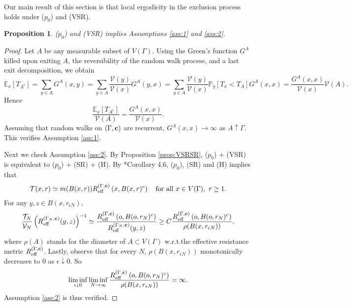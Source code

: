 \documentclass[11pt]{amsart}
\theoremstyle{plain}
\newtheorem{proposition}[lemma]{Proposition}
\theoremstyle{definition}
\theoremstyle{remark}
\begin{document}
Our main result of this section is that local ergodicity in the exclusion process holds under ($p_0$) and (VSR).

\begin{proposition}
\label{SRprop}
($p_0$) and (VSR) implies Assumptions \ref{ass:1} and \ref{ass:2}.
\end{proposition}
\begin{proof}
Let $A$ be any measurable subset of $V(\Gamma)$. Using the Green's function $G^A$ killed upon exiting $A$, the reversibility of the random walk process, and a last exit decomposition, we obtain
\[
\mathbb{E}_x[T_{A^c}] = \sum_{y\in A} G^A(x,y) = \sum_{y\in A} \frac{\mathcal{V}(y)}{\mathcal{V}(x)}G^A(y,x)  = \sum_{y\in A} \frac{\mathcal{V}(y)}{\mathcal{V}(x)} \mathbb{P}_y[T_x<T_A] G^A(x,x) = \frac{G^A(x,x) }{\mathcal{V}(x)} \mathcal{V}(A).
\]
Hence
\[
\frac{\mathbb{E}_x[T_{A^c}]}{\mathcal{V}(A)} = \frac{G^A(x,x)}{\mathcal{V}(x)}.
\]
Assuming that random walks on $(\Gamma, {\bf c})$ are recurrent, $G^A(x,x) \to \infty$ as $A\uparrow \Gamma$. This verifies Assumption \ref{ass:1}.

Next we check Assumption \ref{ass:2}. By Proposition \ref{prop:VSRSR}, ($p_0$) $+$ (VSR) is equivalent to ($p_0$) $+$ (SR) $+$ (H). By \cite{Telcs01_2}*{Corollary 4.6}, ($p_0$), (SR) and (H) implies that
\begin{align}
\label{TelcsScaling}
\mathcal{T}(x,r) \simeq m(B(x,r)) R_{\rm eff}^{(\Gamma, {\bf c})}\left(x, B(x,r)^c\right) \quad \text{for all}~x\in V(\Gamma),~r\geq 1.
\end{align}
For any $y,z \in B(x, r_{\epsilon N})$,
\begin{align}
\frac{\mathcal{T}_N}{\mathcal{V}_N} \left(R_{\rm eff}^{(\Gamma_N,{\bf c})}(y,z)\right)^{-1} \simeq \frac{R_{\rm eff}^{(\Gamma, {\bf c})}\left(o,B(o,r_N)^c\right)}{R_{\rm eff}^{(\Gamma_N,{\bf c})}(y,z)} \geq C \frac{R_{\rm eff}^{(\Gamma, {\bf c})}\left(o,B(o,r_N)^c\right)}{\rho(B(x,r_{\epsilon N}))},
\end{align}
where $\rho(A)$ stands for the diameter of $A\subset V(\Gamma)$ w.r.t.\@ the effective resistance metric $R_{\rm eff}^{(\Gamma, {\bf c})}$. Lastly, observe that for every $N$, $\rho(B(x,r_{\epsilon N}))$ monotonically decreases to $0$ as $\epsilon \downarrow 0$. So
\begin{align}
\liminf_{\epsilon\downarrow 0} \liminf_{N\to\infty} \frac{R_{\rm eff}^{(\Gamma, {\bf c})}\left(o,B(o,r_N)^c\right)}{\rho(B(x,r_{\epsilon N}))} = \infty.
\end{align}
Assumption \ref{ass:2} is thus verified.
\end{proof}
\end{document}
